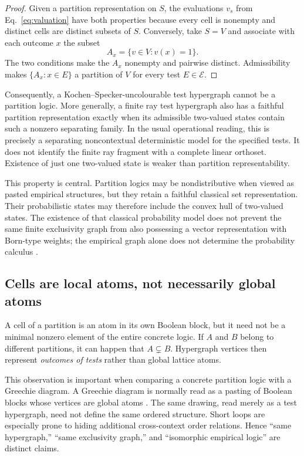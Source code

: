 \documentclass[
  aps,
  pra,
  twocolumn,
  amsmath,
  amssymb,
  longbibliography,
  nofootinbib,
  floatfix
]{revtex4-2}
\newcommand{\cE}{\mathcal E}
\begin{document}
\begin{proof}
Given a partition representation on $S$, the evaluations $v_s$ from
Eq.~\eqref{eq:valuation} have both properties because every cell is nonempty
and distinct cells are distinct subsets of $S$.  Conversely, take $S=V$ and
associate with each outcome $x$ the subset
\begin{equation}
  A_x=\{v\in V:v(x)=1\}.
  \label{eq:state-cell-representation}
\end{equation}
The two conditions make the $A_x$ nonempty and pairwise distinct.
Admissibility makes $\{A_x:x\in E\}$ a partition of $V$ for every test
$E\in\cE$.
\end{proof}

Consequently, a Kochen--Specker-uncolourable test hypergraph cannot be a
partition logic.  More generally, a finite ray test hypergraph also has a
faithful partition representation exactly when its admissible two-valued states
contain such a nonzero separating family.  In the usual operational reading,
this is precisely a separating noncontextual deterministic model for the
specified tests.  It does not identify the finite ray fragment with a complete
linear orthoset.  Existence of just one two-valued state is weaker than
partition representability.

This property is central.  Partition logics may be nondistributive when viewed
as pasted empirical structures, but they retain a faithful classical set
representation.  Their probabilistic states may therefore include the convex
hull of two-valued states.  The existence of that classical probability model
does not prevent the same finite exclusivity graph from also possessing a
vector representation with Born-type weights; the empirical graph alone does
not determine the probability calculus \cite{svozil-2018-b}.

\subsection{Cells are local atoms, not necessarily global atoms}
\label{sec:local-atoms}

A cell of a partition is an atom in its own Boolean block, but it need not be a
minimal nonzero element of the entire concrete logic.  If $A$ and $B$ belong to
different partitions, it can happen that $A\subsetneq B$.  Hypergraph vertices
then represent \emph{outcomes of tests} rather than global lattice atoms.

This observation is important when comparing a concrete partition logic with a
Greechie diagram.  A Greechie diagram is normally read as a pasting of Boolean
blocks whose vertices are global atoms \cite{greechie:71}.  The same drawing,
read merely as a test hypergraph, need not define the same ordered structure.
Short loops are especially prone to hiding additional cross-context order
relations.  Hence ``same hypergraph,'' ``same exclusivity graph,'' and
``isomorphic empirical logic'' are distinct claims.
\end{document}
